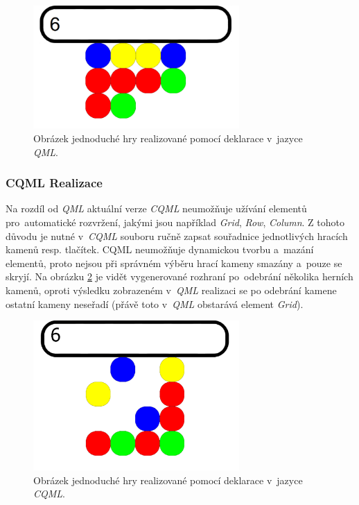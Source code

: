 \documentclass[11pt,twoside,a4paper]{book}
\begin{document}
\begin{figure}[!ht]
\begin{center}
  \includegraphics[width=0.7\textwidth]{qmlGame}
\caption{{\label{fig:outGameQML}}Obrázek jednoduché hry realizované pomocí deklarace v~jazyce \textit{QML}.}
\end{center}
\end{figure}

\subsubsection{CQML Realizace}
Na rozdíl od \textit{QML} aktuální verze \textit{CQML} neumožňuje užívání elementů pro~automatické rozvržení, jakými jsou například \textit{Grid}, \textit{Row}, \textit{Column}. Z tohoto důvodu je nutné v~\textit{CQML} souboru ručně zapsat souřadnice jednotlivých hracích kamenů resp. tlačítek.
CQML neumožňuje dynamickou tvorbu a~mazání elementů, proto nejsou při správném výběru hrací kameny smazány a~pouze se skryjí.
Na obrázku \ref{fig:outGameCQML} je vidět vygenerované rozhraní po~odebrání několika herních kamenů, oproti výsledku zobrazeném v~\textit{QML} realizaci se po odebrání kamene ostatní kameny neseřadí (přávě toto v~\textit{QML} obstarává element \textit{Grid}).
\begin{figure}[!ht]
\begin{center}
  \includegraphics[width=0.7\textwidth]{cqmlGame}
\caption{{\label{fig:outGameCQML}}Obrázek jednoduché hry realizované pomocí deklarace v~jazyce \textit{CQML}.}
\end{center}
\end{figure}
\end{document}
